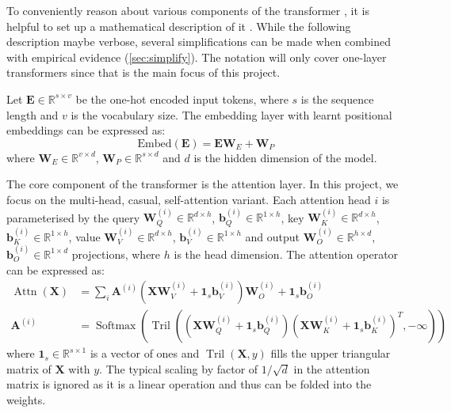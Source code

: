 \documentclass{article}
\renewcommand{\v}[1]{\mathbf{\bm{#1}}}
\newcommand{\m}[1]{\mathbf{\bm{#1}}}
\newcommand{\R}{\mathbb{R}}
\DeclareMathOperator{\softmax}{Softmax}
\DeclareMathOperator{\tril}{Tril}
\DeclareMathOperator{\attn}{Attn}
\begin{document}
To conveniently reason about various components of the transformer \citep{vaswani2017attention}, it is helpful to set up a mathematical description of it \citep{elhage2021mathematical}. While the following description maybe verbose, several simplifications can be made when combined with empirical evidence (\cref{sec:simplify}). The notation will only cover one-layer transformers since that is the main focus of this project.

Let $\m{E} \in \R^{s \times v}$ be the one-hot encoded input tokens, where $s$ is the sequence length and $v$ is the vocabulary size. The embedding layer with learnt positional embeddings can be expressed as:
\begin{equation}  \label{eq:embed}
    \text{Embed}(\m{E}) = \m{E} \m{W}_E + \m{W}_P
\end{equation}
where $\m{W}_E \in \R^{v \times d}$, $\m{W}_P \in \R^{s \times d}$ and $d$ is the hidden dimension of the model.

The core component of the transformer is the attention layer. In this project, we focus on the multi-head, casual, self-attention variant. Each attention head $i$ is parameterised by the query $\m{W}_Q^{(i)} \in \R^{d \times h}$, $\v{b}_Q^{(i)} \in \R^{1 \times h}$, key $\m{W}_K^{(i)} \in \R^{d \times h}$, $\v{b}_K^{(i)} \in \R^{1 \times h}$, value $\m{W}_V^{(i)} \in \R^{d \times h}$, $\v{b}_V^{(i)} \in \R^{1 \times h}$ and output $\m{W}_O^{(i)} \in \R^{h \times d}$, $\v{b}_O^{(i)} \in \R^{1 \times d}$ projections, where $h$ is the head dimension. The attention operator can be expressed as:
\begin{equation}  \label{eq:attn}
    \begin{aligned}
        \attn(\m{X})
         & = \sum_i \m{A}^{(i)} (\m{X} \m{W}_V^{(i)} + \v{1}_s \v{b}_V^{(i)}) \m{W}_O^{(i)} + \v{1}_s \v{b}_O^{(i)} \\
        \m{A}^{(i)}
         & = \softmax\left(
        \tril\left(
        \left(\m{X} \m{W}_Q^{(i)} + \v{1}_s \v{b}_Q^{(i)}\right)
        \left(\m{X} \m{W}_K^{(i)} + \v{1}_s \v{b}_K^{(i)}\right)^T
        , -\infty\right)
        \right)
    \end{aligned}
\end{equation}
where $\v{1}_s \in \R^{s \times 1}$ is a vector of ones and $\tril(\m{X}, y)$ fills the upper triangular matrix of $\m{X}$ with $y$. The typical scaling by factor of $1/\sqrt{d}$ in the attention matrix is ignored as it is a linear operation and thus can be folded into the weights.
\end{document}
